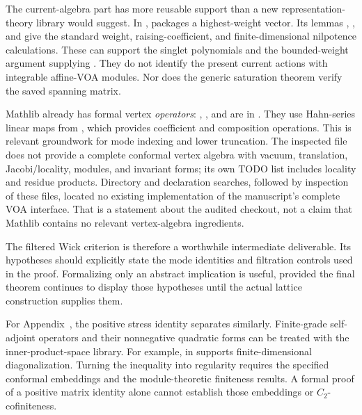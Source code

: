 The current-algebra part has more reusable support than a new
representation-theory library would suggest. In
,
 packages a highest-weight
vector. Its lemmas ,
, and
 give the standard weight,
raising-coefficient, and finite-dimensional nilpotence calculations.
These can support the singlet polynomials and the bounded-weight
argument supplying .
They do not identify the present current actions with integrable
affine-VOA modules. Nor does the generic saturation theorem verify
the saved spanning matrix.

Mathlib already has formal vertex \emph{operators}:
, , and
 are in
.
They use Hahn-series linear maps from
, which provides
coefficient and composition operations. This is relevant groundwork
for mode indexing and lower truncation. The inspected file does not
provide a complete conformal vertex algebra with vacuum, translation,
Jacobi/locality, modules, and invariant forms; its own TODO list
includes locality and residue products. Directory and declaration
searches, followed by inspection of these files, located no existing
implementation of the manuscript's complete VOA interface. That is
a statement about the audited checkout, not a claim that Mathlib
contains no relevant vertex-algebra ingredients.

The filtered Wick criterion is therefore a worthwhile intermediate
deliverable. Its hypotheses should explicitly state the mode identities
and filtration controls used in the proof. Formalizing only an abstract
implication is useful, provided the final theorem continues to display
those hypotheses until the actual lattice construction supplies them.

For Appendix~, the positive stress identity separates similarly.
Finite-grade self-adjoint operators and their nonnegative quadratic
forms can be treated with the inner-product-space library. For example,
 in
 supports
finite-dimensional diagonalization. Turning the inequality into
regularity requires the specified conformal embeddings and the
module-theoretic finiteness results. A formal proof of a positive
matrix identity alone cannot establish those embeddings or
$C_2$-cofiniteness.

